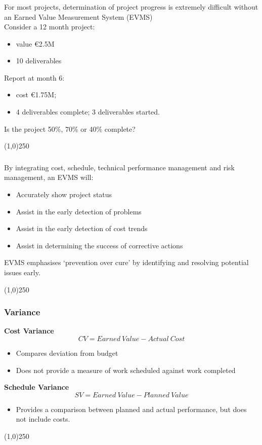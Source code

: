 \begin{frame}
\frametitle{}
For most projects, determination of project progress is extremely difficult without an Earned Value Measurement System (EVMS)\\
Consider a 12 month project: 
\begin{itemize}
	\item value \euro2.5M  
	\item 10 deliverables
\end{itemize}
Report at month 6: 
\begin{itemize}
	\item cost \euro1.75M; 
	\item 4 deliverables complete; 3 deliverables started.
\end{itemize}
Is the project 50\%, 70\% or 40\% complete? 
\end{frame}
\begin{center}\line(1,0){250}\end{center}






\begin{frame}
\frametitle{}
By integrating cost, schedule, technical performance management and risk management, an EVMS will:
\begin{itemize}
	\item Accurately show project status
	\item Assist in the early detection of problems
	\item Assist in the early detection of cost trends
	\item Assist in determining the success of corrective actions
\end{itemize}
EVMS emphasises ‘prevention over cure’ by identifying and resolving potential issues early.\\
\end{frame}
\begin{center}\line(1,0){250}\end{center}






\begin{frame}
\frametitle{Variance}
\textbf{Cost Variance}
\[
CV = Earned\: Value - Actual\: Cost
\]
\begin{itemize}
	\item Compares deviation from budget
	\item Does not provide a measure of work scheduled against work completed
\end{itemize}
\textbf{Schedule Variance}
\[
SV = Earned\: Value - Planned\: Value
\]
\begin{itemize}
	\item Provides a comparison between planned and actual performance, but does not include costs.
\end{itemize}
\end{frame}
\begin{center}\line(1,0){250}\end{center}






